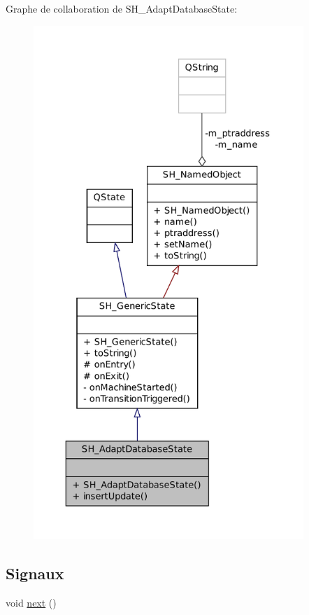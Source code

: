 Graphe de collaboration de S\-H\-\_\-\-Adapt\-Database\-State\-:
\nopagebreak
\begin{figure}[H]
\begin{center}
\leavevmode
\includegraphics[height=550pt]{classSH__AdaptDatabaseState__coll__graph}
\end{center}
\end{figure}
\subsection*{Signaux}
\begin{DoxyCompactItemize}
\item 
void \hyperlink{classSH__GenericState_a030e67a872956135c52e6876d960a7b5}{next} ()
\end{DoxyCompactItemize}
